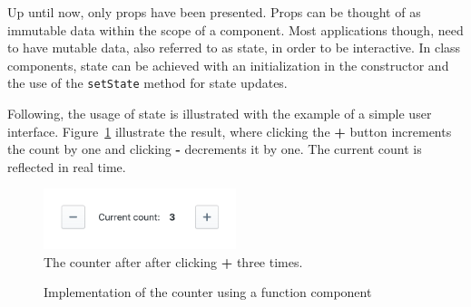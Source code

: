 Up until now, only props have been presented.
Props can be thought of as
immutable data within the scope of a component. Most applications
though, need to have mutable data, also referred to as state, in order
to be interactive.
In class components, state can be achieved with an
initialization in the constructor and the use of the \texttt{setState}
method for state updates.


Following, the usage of state is illustrated with the example of a simple
user interface. Figure~\ref{counter_2}
illustrate the result, where clicking the \textbf{+} button increments the count by one
and clicking \textbf{-} decrements it by one. The current count is
reflected in real time.

\begin{figure}
    \centering
    \includegraphics[width=0.5\textwidth]{images/Untitled_1.png}
    \caption{The counter after after clicking \textbf{+} three times.}
    \label{counter_2}
\end{figure}

\begin{figure}
\begin{Shaded}
\begin{Highlighting}[]
 \NormalTok{() \{}
    \NormalTok{ [count}\OperatorTok{,}\NormalTok{ setCount] }\OperatorTok{=} \NormalTok{(}\NormalTok{)}\OperatorTok{;}
            \OperatorTok{=}\VariableTok{\{}\VariableTok{\}}
            \OperatorTok{=}\VariableTok{\{}\NormalTok{() }\KeywordTok{=\textgreater{}} \OperatorTok{{-}} \NormalTok{)}\VariableTok{\}}
        \FunctionTok{/\textgreater{}}
        \VariableTok{\{}\VariableTok{\}}
            \OperatorTok{=}\VariableTok{\{}\VariableTok{\}}
            \OperatorTok{=}\VariableTok{\{}\NormalTok{() }\KeywordTok{=\textgreater{}} \OperatorTok{+} \NormalTok{)}\VariableTok{\}}
        \FunctionTok{/\textgreater{}}
\NormalTok{\}}
\end{Highlighting}
\end{Shaded}
\caption{Implementation of the counter using a function component}
\label{code_counter_function}
\end{figure}

